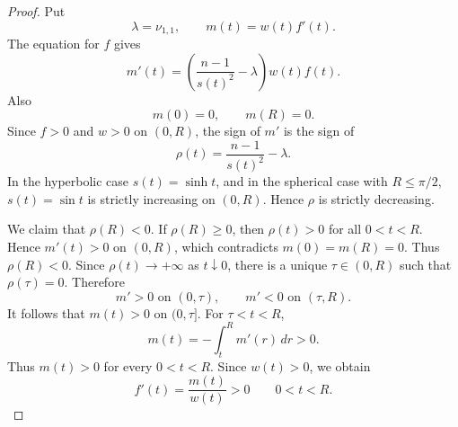 \documentclass[11pt]{amsart}
\theoremstyle{remark}
\begin{document}
\begin{proof}
Put
$$
        \lambda=\nu_{1,1},
        \qquad
        m(t)=w(t)f'(t).
$$
The equation for \(f\) gives
$$
        m'(t)
        =
        \left(\frac{n-1}{s(t)^2}-\lambda\right)w(t)f(t).
$$
Also
$$
        m(0)=0,
        \qquad
        m(R)=0.
$$
Since \(f>0\) and \(w>0\) on \((0,R)\), the sign of \(m'\) is the sign of
$$
        \rho(t)=\frac{n-1}{s(t)^2}-\lambda.
$$
In the hyperbolic case \(s(t)=\sinh t\), and in the spherical case with
\(R\le\pi/2\), \(s(t)=\sin t\) is strictly increasing on \((0,R)\).  Hence
\(\rho\) is strictly decreasing.

We claim that \(\rho(R)<0\).  If \(\rho(R)\ge0\), then \(\rho(t)>0\) for
all \(0<t<R\).  Hence \(m'(t)>0\) on \((0,R)\), which contradicts
\(m(0)=m(R)=0\).  Thus \(\rho(R)<0\).  Since \(\rho(t)\to+\infty\) as
\(t\downarrow0\), there is a unique \(\tau\in(0,R)\) such that
\(\rho(\tau)=0\).  Therefore
$$
        m'>0 \text{ on }(0,\tau),
        \qquad
        m'<0 \text{ on }(\tau,R).
$$
It follows that \(m(t)>0\) on \((0,\tau]\).  For \(\tau<t<R\),
$$
        m(t)=-\int_t^R m'(r)\,dr>0.
$$
Thus \(m(t)>0\) for every \(0<t<R\).  Since \(w(t)>0\), we obtain
$$
        f'(t)=\frac{m(t)}{w(t)}>0
        \qquad
        0<t<R.
$$
\end{proof}
\end{document}

